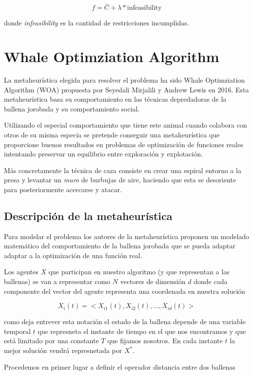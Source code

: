 \documentclass[11pt]{article}
\begin{document}
\[
  f = \bar C + \lambda * \text{infeasibility}
\]

donde \textit{infeasibility} es la cantidad de restricciones incumplidas.

\section{Whale Optimziation Algorithm}

La metaheurística elegida para resolver el problema ha sido Whale Optimziation
Algorithm (WOA) propuesta por Seyedali Mirjalili y Andrew Lewis en 2016. Esta
metaheurística basa su comportamiento en las técnicas depredadoras de la ballena
jorobada y su comportamiento social. 

Utilizando el especial comportamiento que tiene este animal cuando colabora con 
otros de su misma especia se pretende conseguir una metaheurística que proporcione
buenos resultados en problemas de optimización de funciones reales intentando 
preservar un equilibrio entre exploración y explotación.

Más concretamente la técnica de caza consiste en crear una espiral entorno a la 
presa y levantar un \textit{muro} de burbujas de aire, haciendo que esta se desoriente
para posteriormente acercarse y atacar. 

\subsection{Descripción de la metaheurística}

Para modelar el problema los autores de la metaheurística proponen un modelado 
matemático del comportamiento de la ballena jorobada que se pueda adaptar adaptar 
a la optimización de una función real.

Los agentes $X$ que participan en nuestro algoritmo (y que representan a las
ballenas) se van a representar como $N$ vectores de dimensión $d$ donde cada
componente del vector del agente representa una coordenada en nuestra solución

\[
    X_i(t) = <X_{i1}(t), X_{i2}(t), \dots, X_{id}(t)>
\]

como deja entrever esta notación el estado de la ballena depende de una variable 
temporal $t$ que represneta el instante de tiempo en el que nos encontramos y 
que está limitado por una constante $T$ que fijamos nosotros. En cada instante 
$t$ la mejor solución vendrá represnetada por $X^*$.

Procedemos en primer lugar a definir el operador distancia entre dos ballenas
\end{document}
